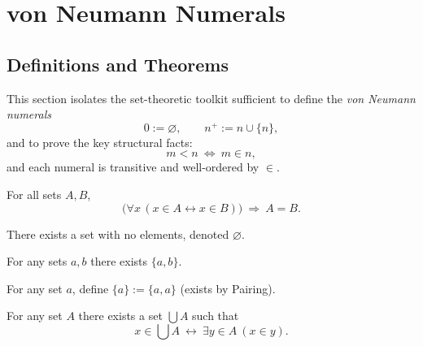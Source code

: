 
\section{von Neumann Numerals}
\label{sec:von-neumann-numerals}

\subsection{Definitions and Theorems}

\begin{remark}[Purpose]
This section isolates the set-theoretic toolkit sufficient to define the
\emph{von Neumann numerals}
\[
0 := \varnothing,\qquad n^{+} := n\cup\{n\},
\]
and to prove the key structural facts:
\[
m<n\ \Longleftrightarrow\ m\in n,
\]
and each numeral is transitive and well-ordered by $\in$.
\end{remark}


\begin{axiom}[Extensionality]
\label{ax:vn-extensionality}
For all sets $A,B$,
\[
\bigl(\forall x\,(x\in A \leftrightarrow x\in B)\bigr)\ \Rightarrow\ A=B.
\]
\end{axiom}

\begin{axiom}
\label{ax:vn-empty-set}
There exists a set with no elements, denoted $\varnothing$.
\end{axiom}

\begin{axiom}[Pairing]
\label{ax:vn-pairing}
For any sets $a,b$ there exists $\{a,b\}$.
\end{axiom}

\begin{definition}[Singleton]
\label{def:vn-singleton}
For any set $a$, define $\{a\}:=\{a,a\}$ (exists by Pairing).
\end{definition}

\begin{axiom}[Union]
\label{ax:zf-union}
For any set $A$ there exists a set $\bigcup A$ such that
\[
x\in \bigcup A\ \leftrightarrow\ \exists y\in A\ (x\in y).
\]
\end{axiom}

